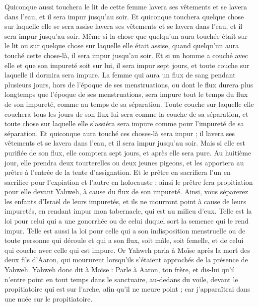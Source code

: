 \begin{multicols}{2}
Quiconque aussi touchera le lit de cette femme lavera ses vêtements et se lavera dans l'eau, et il sera impur jusqu'au soir.
Et quiconque touchera quelque chose sur laquelle elle se sera assise lavera ses vêtements et se lavera dans l'eau, et il sera impur jusqu'au soir.
Même si la chose que quelqu'un aura touchée était sur le lit ou sur quelque chose sur laquelle elle était assise, quand quelqu'un aura touché cette chose-là, il sera impur jusqu'au soir.
Et si un homme a couché avec elle et que son impureté soit sur lui, il sera impur sept jours, et toute couche sur laquelle il dormira sera impure.
La femme qui aura un flux de sang pendant plusieurs jours, hors de l'époque de ses menstruations, ou dont le flux durera plus longtemps que l'époque de ses menstruations, sera impure tout le temps du flux de son impureté, comme au temps de sa séparation.
Toute couche sur laquelle elle couchera tous les jours de son flux lui sera comme la couche de sa séparation, et toute chose sur laquelle elle s'assiéra sera impure comme pour l'impureté de sa séparation.
Et quiconque aura touché ces choses-là sera impur ; il lavera ses vêtements et se lavera dans l'eau, et il sera impur jusqu'au soir.
Mais si elle est purifiée de son flux, elle comptera sept jours, et après elle sera pure.
Au huitième jour, elle prendra deux tourterelles ou deux jeunes pigeons, et les apportera au prêtre à l'entrée de la tente d'assignation.
Et le prêtre en sacrifiera l'un en sacrifice pour l'expiation et l'autre en holocauste ; ainsi le prêtre fera propitiation pour elle devant Yahweh, à cause du flux de son impureté.
Ainsi, vous séparerez les enfants d'Israël de leurs impuretés, et ils ne mourront point à cause de leurs impuretés, en rendant impur mon tabernacle, qui est au milieu d'eux.
Telle est la loi pour celui qui a une gonorrhée ou de celui duquel sort la semence qui le rend impur.
Telle est aussi la loi pour celle qui a son indisposition menstruelle ou de toute personne qui découle et qui a son flux, soit mâle, soit femelle, et de celui qui couche avec celle qui est impure.
\VerseOne{}Or Yahweh parla à Moïse après la mort des deux fils d'Aaron, qui moururent lorsqu'ils s'étaient approchés de la présence de Yahweh.
Yahweh donc dit à Moïse : Parle à Aaron, ton frère, et dis-lui qu'il n'entre point en tout temps dans le sanctuaire, au-dedans du voile, devant le propitiatoire qui est sur l'arche, afin qu'il ne meure point ; car j'apparaîtrai dans une nuée sur le propitiatoire.

\end{multicols}
